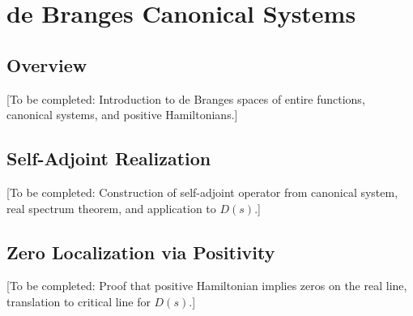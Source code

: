 \section{de Branges Canonical Systems}

\subsection{Overview}

[To be completed: Introduction to de Branges spaces of entire functions, canonical systems, and positive Hamiltonians.]

\subsection{Self-Adjoint Realization}

[To be completed: Construction of self-adjoint operator from canonical system, real spectrum theorem, and application to $D(s)$.]

\subsection{Zero Localization via Positivity}

[To be completed: Proof that positive Hamiltonian implies zeros on the real line, translation to critical line for $D(s)$.]
